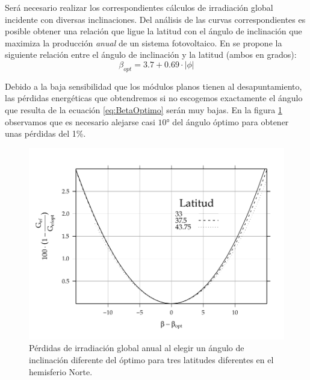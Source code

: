


Será necesario realizar los correspondientes cálculos de irradiación
global incidente con diversas inclinaciones. Del análisis de las curvas
correspondientes es posible obtener una relación que ligue la latitud
con el ángulo de inclinación que maximiza la producción\emph{ anual
}de un sistema fotovoltaico. En \cite{Lorenzo2006c} se propone la
siguiente relación entre el ángulo de inclinación y la latitud (ambos
en grados): \begin{equation}
\beta_{opt}=3.7+0.69\cdot|\phi|\label{eq:BetaOptimo}\end{equation}


Debido a la baja sensibilidad que los módulos planos tienen al desapuntamiento,
las pérdidas energéticas que obtendremos si no escogemos exactamente
el ángulo que resulta de la ecuación \ref{eq:BetaOptimo} serán muy
bajas. En la figura \ref{fig:PerdidasInclinacionOptima} observamos
que es necesario alejarse casi $\ang{10}$ del ángulo óptimo para
obtener unas pérdidas del 1\%.

%
\begin{figure}
\includegraphics[scale=0.75]{../figs/PerdidasInclinacionOptima}

\caption{Pérdidas de irradiación global anual al elegir un ángulo de inclinación
diferente del óptimo para tres latitudes diferentes en el hemisferio
Norte.\label{fig:PerdidasInclinacionOptima}}



\end{figure}



